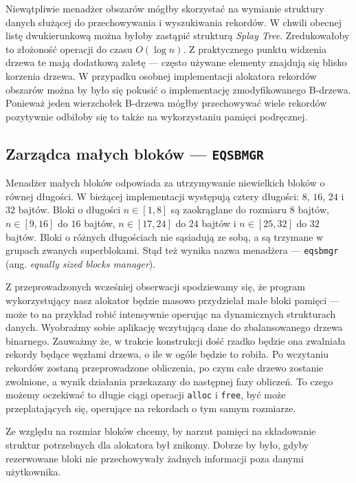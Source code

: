\documentclass[12pt,a4paper,titlepage,twoside]{mwart}
\begin{document}
Niewątpliwie menadżer obszarów mógłby skorzystać na wymianie struktury danych
służącej do przechowywania i wyszukiwania rekordów. W chwili obecnej listę
dwukierunkową można byłoby zastąpić strukturą \textit{Splay Tree}.
Zredukowałoby to złożoność operacji do czasu $O(\log n)$. Z praktycznego punktu
widzenia drzewa te mają dodatkową zaletę --- często używane elementy znajdują
się blisko korzenia drzewa. W przypadku osobnej implementacji alokatora
rekordów obszarów można by było się pokusić o implementację zmodyfikowanego
B-drzewa.  Ponieważ jeden wierzchołek B-drzewa mógłby przechowywać wiele
rekordów pozytywnie odbiłoby się to także na wykorzystaniu pamięci podręcznej.

\newpage

\subsection{Zarządca małych bloków --- \texttt{EQSBMGR}}

Menadżer małych bloków odpowiada za utrzymywanie niewielkich bloków o równej
długości. W bieżącej implementacji występują cztery długości: $8$, $16$, $24$ i
$32$ bajtów. Bloki o długości $n \in [1,8]$ są zaokrąglane do rozmiaru $8$
bajtów, $n \in [9,16]$ do $16$ bajtów, $n \in [17,24]$ do $24$ bajtów i $n \in
[25,32]$ do $32$ bajtów. Bloki o różnych długościach nie sąsiadują ze sobą, a
są trzymane w grupach zwanych superblokami. Stąd też wynika nazwa menadżera ---
\texttt{eqsbmgr} (ang. \textit{equally sized blocks manager}).

Z przeprowadzonych wcześniej obserwacji spodziewamy się, że program
wykorzystujący nasz alokator będzie masowo przydzielał małe bloki pamięci ---
może to na przykład robić intensywnie operując na dynamicznych strukturach danych.
Wyobraźmy sobie aplikację wczytującą dane do zbalansowanego drzewa binarnego.
Zauważmy że, w trakcie konstrukcji dość rzadko będzie ona zwalniała rekordy
będące węzłami drzewa, o ile w ogóle będzie to robiła. Po wczytaniu rekordów
zostaną przeprowadzone obliczenia, po czym całe drzewo zostanie zwolnione, a
wynik działania przekazany do następnej fazy obliczeń. To czego możemy
oczekiwać to długie ciągi operacji \texttt{alloc} i \texttt{free}, być może
przeplatających się, operujące na rekordach o tym samym rozmiarze.

Ze względu na rozmiar bloków chcemy, by narzut pamięci na składowanie struktur
potrzebnych dla alokatora był znikomy. Dobrze by było, gdyby rezerwowane bloki
nie przechowywały żadnych informacji poza danymi użytkownika.
\end{document}
